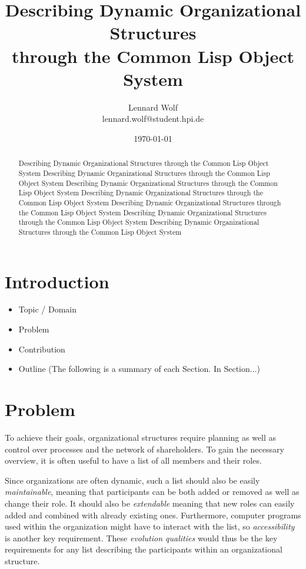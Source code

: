 \documentclass[oribibl]{llncs}
\author{Lennard Wolf \\
        lennard.wolf@student.hpi.de}
\institute{ Hasso Plattner Institute \\
            Prof.-Dr.-Helmert-Straße 2-3 \\
            14482 Potsdam \\
            Germany}
\title{Describing Dynamic Organizational Structures \\
 through the Common Lisp Object System}
\date{\today}
\begin{document}
\thispagestyle{empty}
\vfill

%
\maketitle
%
\begin{abstract}
Describing Dynamic Organizational Structures through the Common Lisp Object System Describing Dynamic Organizational Structures through the Common Lisp Object System Describing Dynamic Organizational Structures through the Common Lisp Object System Describing Dynamic Organizational Structures through the Common Lisp Object System Describing Dynamic Organizational Structures through the Common Lisp Object System Describing Dynamic Organizational Structures through the Common Lisp Object System Describing Dynamic Organizational Structures through the Common Lisp Object System
\end{abstract}
%


\section{Introduction}


\begin{itemize}
\item Topic / Domain
\item Problem
\item Contribution
\item Outline (The following is a summary of each Section. In Section...)
\end{itemize}


\section{Problem}
\label{sec:problem}

To achieve their goals, organizational structures require planning as well as control over processes and the network of shareholders. \cite[42f.]{Schmidt2000} To gain the necessary overview, it is often useful to have a list of all members and their roles. 

Since organizations are often dynamic, such a list should also be easily \emph{maintainable}, meaning that participants can be both added or removed as well as change their role. It should also be \emph{extendable} meaning that new roles can easily added and combined with already existing ones. Furthermore, computer programs used within the organization might have to interact with the list, so \emph{accessibility} is another key requirement. These \emph{evolution qualities} \cite{young2001effective} would thus be the key requirements for  any list describing the participants within an organizational structure.
\end{document}
